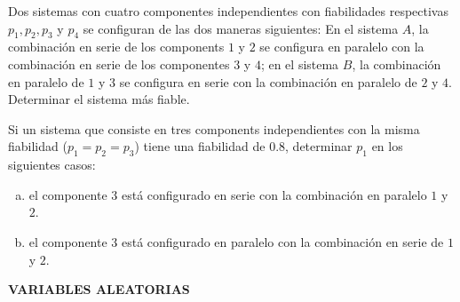 \documentclass[12pt]{article}
\begin{document}
\probl  Dos sistemas con cuatro componentes independientes con
fiabilidades respectivas $p_1, p_2, p_3$ y $p_4$ se configuran de
las dos maneras siguientes: En el sistema $A$, la combinación en
serie de los components $1$  y $2$ se configura en paralelo con la
combinación en serie de los componentes $3$ y $4$; en el sistema
$B$, la combinación en paralelo de $1$ y $3$ se configura en serie
con la combinación en paralelo de $2$ y $4$. Determinar el sistema
más fiable. 

\probl  Si un sistema que consiste en tres components independientes con la misma
fiabilidad ($p_1=p_2=p_3$) tiene una fiabilidad de $0.8$, determinar $p_1$ en los
siguientes casos:

\begin{enumerate}[a)]
\item el componente 3 está configurado en serie con la combinación en paralelo
$1$ y $2$.
 \item el componente 3 está configurado en paralelo
con la combinación en serie de $1$ y $2$.
\end{enumerate}



%
\newpage

\begin{centerline}
{{\bf VARIABLES ALEATORIAS}}
\end{centerline}
\end{document}
